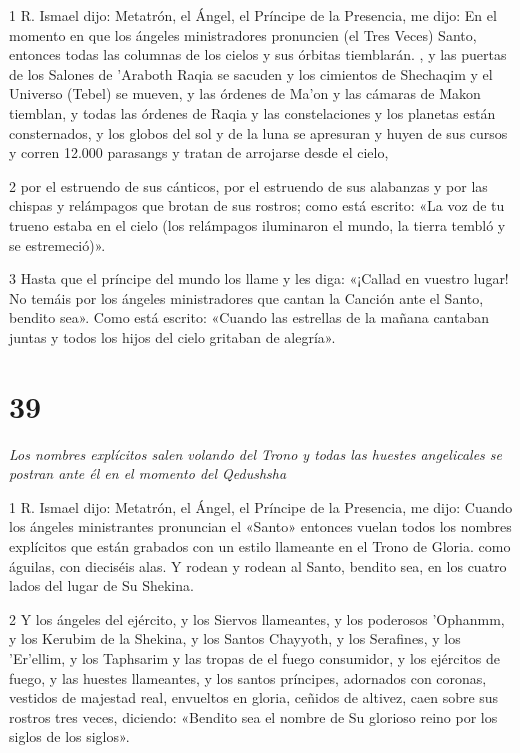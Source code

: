 \par 1 R. Ismael dijo: Metatrón, el Ángel, el Príncipe de la Presencia, me dijo: En el momento en que los ángeles ministradores pronuncien (el Tres Veces) Santo, entonces todas las columnas de los cielos y sus órbitas tiemblarán. , y las puertas de los Salones de 'Araboth Raqia se sacuden y los cimientos de Shechaqim y el Universo (Tebel) se mueven, y las órdenes de Ma'on y las cámaras de Makon tiemblan, y todas las órdenes de Raqia y las constelaciones y los planetas están consternados, y los globos del sol y de la luna se apresuran y huyen de sus cursos y corren 12.000 parasangs y tratan de arrojarse desde el cielo,

\par 2 por el estruendo de sus cánticos, por el estruendo de sus alabanzas y por las chispas y relámpagos que brotan de sus rostros; como está escrito: «La voz de tu trueno estaba en el cielo (los relámpagos iluminaron el mundo, la tierra tembló y se estremeció)».

\par 3 Hasta que el príncipe del mundo los llame y les diga: «¡Callad en vuestro lugar! No temáis por los ángeles ministradores que cantan la Canción ante el Santo, bendito sea». Como está escrito: «Cuando las estrellas de la mañana cantaban juntas y todos los hijos del cielo gritaban de alegría».



\chapter{39}

\par \textit{Los nombres explícitos salen volando del Trono y todas las huestes angelicales se postran ante él en el momento del Qedushsha}

\par 1 R. Ismael dijo: Metatrón, el Ángel, el Príncipe de la Presencia, me dijo: Cuando los ángeles ministrantes pronuncian el «Santo» entonces vuelan todos los nombres explícitos que están grabados con un estilo llameante en el Trono de Gloria. como águilas, con dieciséis alas. Y rodean y rodean al Santo, bendito sea, en los cuatro lados del lugar de Su Shekina.

\par 2 Y los ángeles del ejército, y los Siervos llameantes, y los poderosos 'Ophanmm, y los Kerubim de la Shekina, y los Santos Chayyoth, y los Serafines, y los 'Er'ellim, y los Taphsarim y las tropas de el fuego consumidor, y los ejércitos de fuego, y las huestes llameantes, y los santos príncipes, adornados con coronas, vestidos de majestad real, envueltos en gloria, ceñidos de altivez, caen sobre sus rostros tres veces, diciendo: «Bendito sea el nombre de Su glorioso reino por los siglos de los siglos».


